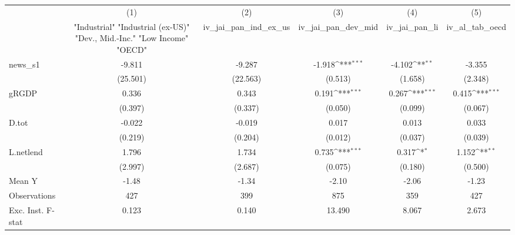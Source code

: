 {
\def\sym#1{\ifmmode^{#1}\else\(^{#1}\)\fi}
\begin{tabular}{l*{5}{c}}
\toprule
            &\multicolumn{1}{c}{(1)}&\multicolumn{1}{c}{(2)}&\multicolumn{1}{c}{(3)}&\multicolumn{1}{c}{(4)}&\multicolumn{1}{c}{(5)}\\
            &\multicolumn{1}{c}{ "Industrial" "Industrial (ex-US)" "Dev., Mid.-Inc." "Low Income" "OECD" }&\multicolumn{1}{c}{iv\_jai\_pan\_ind\_ex\_us}&\multicolumn{1}{c}{iv\_jai\_pan\_dev\_mid}&\multicolumn{1}{c}{iv\_jai\_pan\_li}&\multicolumn{1}{c}{iv\_al\_tab\_oecd}\\
\midrule
news\_s1     &      -9.811         &      -9.287         &      -1.918\sym{***}&      -4.102\sym{**} &      -3.355         \\
            &    (25.501)         &    (22.563)         &     (0.513)         &     (1.658)         &     (2.348)         \\
\addlinespace
gRGDP       &       0.336         &       0.343         &       0.191\sym{***}&       0.267\sym{***}&       0.415\sym{***}\\
            &     (0.397)         &     (0.337)         &     (0.050)         &     (0.099)         &     (0.067)         \\
\addlinespace
D.tot       &      -0.022         &      -0.019         &       0.017         &       0.013         &       0.033         \\
            &     (0.219)         &     (0.204)         &     (0.012)         &     (0.037)         &     (0.039)         \\
\addlinespace
L.netlend   &       1.796         &       1.734         &       0.735\sym{***}&       0.317\sym{*}  &       1.152\sym{**} \\
            &     (2.997)         &     (2.687)         &     (0.075)         &     (0.180)         &     (0.500)         \\
\midrule
Mean Y      &       -1.48         &       -1.34         &       -2.10         &       -2.06         &       -1.23         \\
Observations&         427         &         399         &         875         &         359         &         427         \\
Exc. Inst. F-stat&       0.123         &       0.140         &      13.490         &       8.067         &       2.673         \\
\bottomrule
\end{tabular}
}
